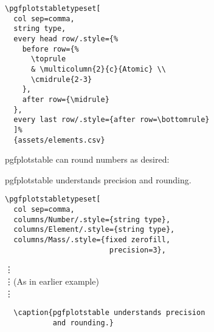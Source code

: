 \begin{frame}[fragile]{\href{https://ctan.org/pkg/pgfplotstable?lang=en}%
                            {}}
  \begin{lstlisting}
\pgfplotstabletypeset[
  col sep=comma,
  string type,
  every head row/.style={%
    before row={%
      \toprule
      & \multicolumn{2}{c}{Atomic} \\
      \cmidrule{2-3}
    },
    after row={\midrule}
  },
  every last row/.style={after row=\bottomrule}
  ]%
  {assets/elements.csv}
  \end{lstlisting}
\end{frame}

\begin{frame}[fragile]{\href{https://ctan.org/pkg/pgfplotstable?lang=en}%
                            {}}
  pgfplotstable can round numbers as desired:
  \begin{table}
    \caption{pgfplotstable understands precision and rounding.}
  \end{table}
\end{frame}

\begin{frame}[fragile]{\href{https://ctan.org/pkg/pgfplotstable?lang=en}%
                            {}}
  \begin{lstlisting}
\pgfplotstabletypeset[
  col sep=comma,
  columns/Number/.style={string type},
  columns/Element/.style={string type},
  columns/Mass/.style={fixed zerofill, 
                        precision=3},
  \end{lstlisting}
\vspace{-0.5cm}\hspace{0.25cm}\vdots \\
\hspace{0.25cm}\vdots\quad(As in earlier example) \\
\hspace{0.25cm}\vdots
  \begin{lstlisting}
  \caption{pgfplotstable understands precision
           and rounding.}
  \end{lstlisting}
\end{frame}


